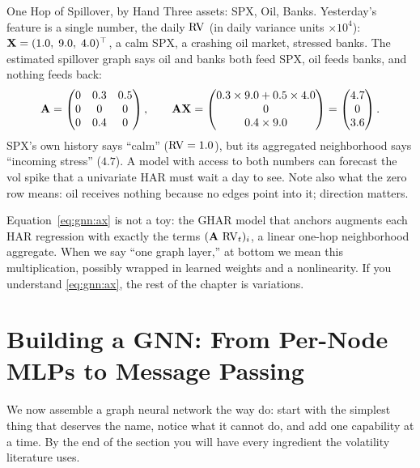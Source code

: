 \begin{workedexample}{One Hop of Spillover, by Hand}
Three assets: SPX, Oil, Banks. Yesterday's feature is a single number, the daily $\operatorname{RV}$ (in daily variance units $\times 10^4$): $\mathbf{X} = (1.0,\; 9.0,\; 4.0)^\top$, a calm SPX, a crashing oil market, stressed banks. The estimated spillover graph says oil and banks both feed SPX, oil feeds banks, and nothing feeds back:
\[
\mathbf{A} =
\begin{pmatrix}
0 & 0.3 & 0.5 \\
0 & 0 & 0 \\
0 & 0.4 & 0
\end{pmatrix},
\qquad
\mathbf{A}\mathbf{X} =
\begin{pmatrix}
0.3 \times 9.0 + 0.5 \times 4.0 \\
0 \\
0.4 \times 9.0
\end{pmatrix}
=
\begin{pmatrix}
4.7 \\
0 \\
3.6
\end{pmatrix}.
\]
SPX's own history says ``calm'' ($\operatorname{RV} = 1.0$), but its aggregated neighborhood says ``incoming stress'' ($4.7$). A model with access to both numbers can forecast the vol spike that a univariate HAR must wait a day to see. Note also what the zero row means: oil receives nothing because no edges point into it; direction matters.
\end{workedexample}

\begin{projectconnection}
Equation~\eqref{eq:gnn:ax} is not a toy: the GHAR model that anchors  augments each HAR regression with exactly the terms $(\mathbf{A}\,\operatorname{RV}_t)_i$, a linear one-hop neighborhood aggregate. When we say ``one graph layer,'' at bottom we mean this multiplication, possibly wrapped in learned weights and a nonlinearity. If you understand \eqref{eq:gnn:ax}, the rest of the chapter is variations.
\end{projectconnection}

\section{Building a GNN: From Per-Node MLPs to Message Passing}\label{sec:gnn:building}

We now assemble a graph neural network the way \citet{SanchezLengeling2021} do: start with the simplest thing that deserves the name, notice what it cannot do, and add one capability at a time. By the end of the section you will have every ingredient the volatility literature uses.


